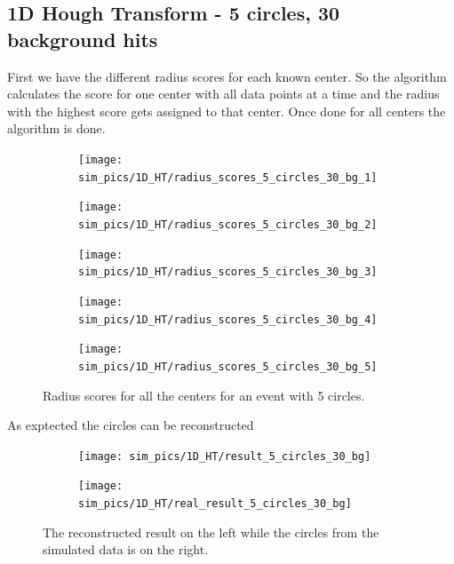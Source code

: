 \documentclass[11pt,twoside]{scrreprt}
\begin{document}
\subsection{1D Hough Transform - 5 circles, 30 background hits} %
\label{sub:1d_hough_transform_5_circles_30_background_hits}
First we have the different radius scores for each known center. So the algorithm calculates the score for one center with all data points at a
time and the radius with the highest score gets assigned to that center.
Once done for all centers the algorithm is done.
\begin{figure}[htbp]
  \centering
  \begin{subfigure}{0.3\textwidth}
  \centering
  \texttt{[image: sim\_pics/1D\_HT/radius\_scores\_5\_circles\_30\_bg\_1]}
  \end{subfigure}
  \begin{subfigure}{0.3\textwidth}
  \centering
  \texttt{[image: sim\_pics/1D\_HT/radius\_scores\_5\_circles\_30\_bg\_2]}
  \end{subfigure}
      \begin{subfigure}{0.3\textwidth}
  \centering
  \texttt{[image: sim\_pics/1D\_HT/radius\_scores\_5\_circles\_30\_bg\_3]}
  \end{subfigure}

  \begin{subfigure}{0.3\textwidth}
  \centering
  \texttt{[image: sim\_pics/1D\_HT/radius\_scores\_5\_circles\_30\_bg\_4]}
  \end{subfigure}
  \begin{subfigure}{0.3\textwidth}
  \centering
  \texttt{[image: sim\_pics/1D\_HT/radius\_scores\_5\_circles\_30\_bg\_5]}
  \end{subfigure}
  \caption{Radius scores for all the centers for an event with 5 circles.}
  \label{fig:5_circles_30_bg_radius}
\end{figure}
As exptected the circles can be reconstructed
\begin{figure}[htbp]
  \centering
  \begin{subfigure}{0.45\textwidth}
  \texttt{[image: sim\_pics/1D\_HT/result\_5\_circles\_30\_bg]}
  \end{subfigure}
  \begin{subfigure}{0.45\textwidth}
  \texttt{[image: sim\_pics/1D\_HT/real\_result\_5\_circles\_30\_bg]}
  \end{subfigure}
  \caption{The reconstructed result on the left while the circles from the simulated data is on the right.}
  \label{fig:figure1}
\end{figure}
\end{document}
